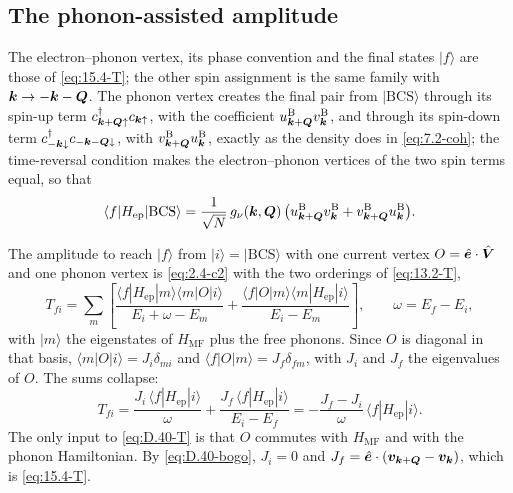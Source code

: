 \subsection*{The phonon-assisted amplitude}

The electron--phonon vertex, its phase convention and the final states $|f\rangle$ are those of \cref{eq:15.4-T}; the other spin assignment is the same family with $\bm{k} \to -\bm{k}-\bm{Q}$. The phonon vertex creates the final pair from $|\mathrm{BCS}\rangle$ through its spin-up term $c^\dagger_{\bm{k}+\bm{Q}\uparrow}c_{\bm{k}\uparrow}$, with the coefficient $u^{\mathrm{B}}_{\bm{k}+\bm{Q}}v^{\mathrm{B}}_{\bm{k}}$, and through its spin-down term $c^\dagger_{-\bm{k}\downarrow}c_{-\bm{k}-\bm{Q}\downarrow}$, with $v^{\mathrm{B}}_{\bm{k}+\bm{Q}}u^{\mathrm{B}}_{\bm{k}}$, exactly as the density does in \cref{eq:7.2-coh}; the time-reversal condition makes the electron--phonon vertices of the two spin terms equal, so that
\begin{equation*}
  \langle f|H_{\mathrm{ep}}|\mathrm{BCS}\rangle = \frac{1}{\sqrt N}\,g_\nu(\bm{k},\bm{Q})\,\bigl(u^{\mathrm{B}}_{\bm{k}+\bm{Q}}v^{\mathrm{B}}_{\bm{k}} + v^{\mathrm{B}}_{\bm{k}+\bm{Q}}u^{\mathrm{B}}_{\bm{k}}\bigr) .
\end{equation*}

The amplitude to reach $|f\rangle$ from $|i\rangle = |\mathrm{BCS}\rangle$ with one current vertex $O = \hat{\bm{e}}\cdot\hat{\bm{V}}$ and one phonon vertex is \cref{eq:2.4-c2} with the two orderings of \cref{eq:13.2-T},
\begin{equation*}
  T_{fi} = \sum_m\left[\frac{\langle f|H_{\mathrm{ep}}|m\rangle\langle m|O|i\rangle}{E_i + \omega - E_m} + \frac{\langle f|O|m\rangle\langle m|H_{\mathrm{ep}}|i\rangle}{E_i - E_m}\right] , \qquad \omega = E_f - E_i ,
\end{equation*}
with $|m\rangle$ the eigenstates of $H_{\mathrm{MF}}$ plus the free phonons. Since $O$ is diagonal in that basis, $\langle m|O|i\rangle = J_i\delta_{mi}$ and $\langle f|O|m\rangle = J_f\delta_{fm}$, with $J_i$ and $J_f$ the eigenvalues of $O$. The sums collapse:
\begin{equation}
  T_{fi} = \frac{J_i\,\langle f|H_{\mathrm{ep}}|i\rangle}{\omega} + \frac{J_f\,\langle f|H_{\mathrm{ep}}|i\rangle}{E_i - E_f} = -\frac{J_f - J_i}{\omega}\,\langle f|H_{\mathrm{ep}}|i\rangle .
  \label{eq:D.40-T}
\end{equation}
The only input to \cref{eq:D.40-T} is that $O$ commutes with $H_{\mathrm{MF}}$ and with the phonon Hamiltonian. By \cref{eq:D.40-bogo}, $J_i = 0$ and $J_f = \hat{\bm{e}}\cdot(\bm{v}_{\bm{k}+\bm{Q}} - \bm{v}_{\bm{k}})$, which is \cref{eq:15.4-T}.

